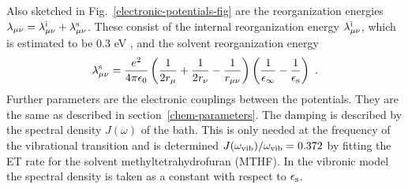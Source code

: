 \documentclass[12pt,twoside,a4paper]{report}
\begin{document}
Also sketched in Fig.~\ref{electronic-potentials-fig} 
are the reorganization energies 
$\lambda_{\mu \nu}=\lambda_{\mu \nu}^{\rm i}+\lambda_{\mu \nu}^{\rm s}$.
These consist of the  internal 
reorganization energy $\lambda_{\mu \nu}^{\rm i}$, 
which is
estimated to be 0.3 eV \cite{r4}, 
and the solvent reorganization energy
\cite{marc56}
\begin{equation}
  \label{3}
  \lambda
   _{\mu \nu}
   ^{\rm s}
             =
                \frac
                    {e^2}
                    {4 \pi \epsilon_0}
                \left(
                     \frac
                         1
                         {2r_\mu}
                  +  \frac
                         1
                         {2r_\nu}
                  -  \frac
                         1
                         {r_{\mu \nu}}
                \right) 
                \left(
                     \frac
                         1
                         {\epsilon_{\infty}}
                  -  \frac
                         1
                         {\epsilon_{\rm s}}
                \right)~.
\end{equation}
Further parameters are the electronic couplings between the potentials.
They are the same as described  in section~\ref{chem-parameters}. 
%
The damping is described by  the
spectral density $J(\omega)$ of the bath. This is only needed at the 
frequency of the vibrational transition and is determined
$J(\omega_{\rm vib})/\omega_{\rm vib}=0.372$ 
by fitting the ET rate for the solvent methyltetrahydrofuran (MTHF).
In the vibronic model the  spectral density
is taken as a constant with respect to $\epsilon_{\rm s}$.
\end{document}
